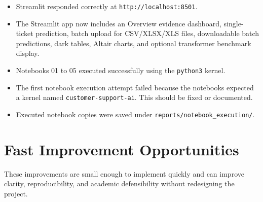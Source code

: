 \documentclass[11pt,a4paper]{article}
\begin{document}
\begin{itemize}
  \item Streamlit responded correctly at \texttt{http://localhost:8501}.
  \item The Streamlit app now includes an Overview evidence dashboard, single-ticket prediction, batch upload for CSV/XLSX/XLS files, downloadable batch predictions, dark tables, Altair charts, and optional transformer benchmark display.
  \item Notebooks 01 to 05 executed successfully using the \texttt{python3} kernel.
  \item The first notebook execution attempt failed because the notebooks expected a kernel named \texttt{customer-support-ai}. This should be fixed or documented.
  \item Executed notebook copies were saved under \texttt{reports/notebook\_execution/}.
\end{itemize}

\section{Fast Improvement Opportunities}
These improvements are small enough to implement quickly and can improve clarity, reproducibility, and academic defensibility without redesigning the project.
\end{document}
